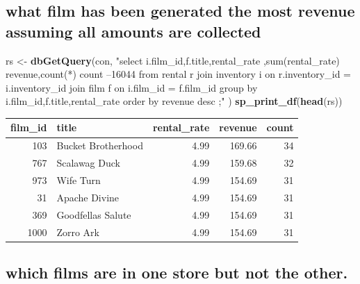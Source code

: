 \documentclass[]{book}
\newenvironment{Shaded}{\begin{snugshade}}{\end{snugshade}}
\newcommand{\KeywordTok}[1]{\textcolor[rgb]{0.13,0.29,0.53}{\textbf{#1}}}
\newcommand{\NormalTok}[1]{#1}
\newcommand{\StringTok}[1]{\textcolor[rgb]{0.31,0.60,0.02}{#1}}
\theoremstyle{definition}
\theoremstyle{definition}
\theoremstyle{definition}
\theoremstyle{remark}
\begin{document}
\hypertarget{what-film-has-been-generated-the-most-revenue-assuming-all-amounts-are-collected}{%
\subsection{what film has been generated the most revenue assuming all
amounts are
collected}\label{what-film-has-been-generated-the-most-revenue-assuming-all-amounts-are-collected}}

\begin{Shaded}
\begin{Highlighting}[]
\NormalTok{rs <-}\StringTok{ }\KeywordTok{dbGetQuery}\NormalTok{(con,}
                \StringTok{"select i.film_id,f.title,rental_rate}
\StringTok{                       ,sum(rental_rate) revenue,count(*) count  --16044}
\StringTok{                   from rental r }
\StringTok{                        join inventory i}
\StringTok{                          on r.inventory_id = i.inventory_id}
\StringTok{                        join film f}
\StringTok{                          on i.film_id = f.film_id}
\StringTok{                 group by i.film_id,f.title,rental_rate}
\StringTok{                 order by revenue desc}
\StringTok{                 ;"}
\NormalTok{                )  }
\KeywordTok{sp_print_df}\NormalTok{(}\KeywordTok{head}\NormalTok{(rs))}
\end{Highlighting}
\end{Shaded}

\begin{tabular}{r|l|r|r|r}
\hline
film\_id & title & rental\_rate & revenue & count\\
\hline
103 & Bucket Brotherhood & 4.99 & 169.66 & 34\\
\hline
767 & Scalawag Duck & 4.99 & 159.68 & 32\\
\hline
973 & Wife Turn & 4.99 & 154.69 & 31\\
\hline
31 & Apache Divine & 4.99 & 154.69 & 31\\
\hline
369 & Goodfellas Salute & 4.99 & 154.69 & 31\\
\hline
1000 & Zorro Ark & 4.99 & 154.69 & 31\\
\hline
\end{tabular}

\hypertarget{which-films-are-in-one-store-but-not-the-other.}{%
\subsection{which films are in one store but not the
other.}\label{which-films-are-in-one-store-but-not-the-other.}}
\end{document}
